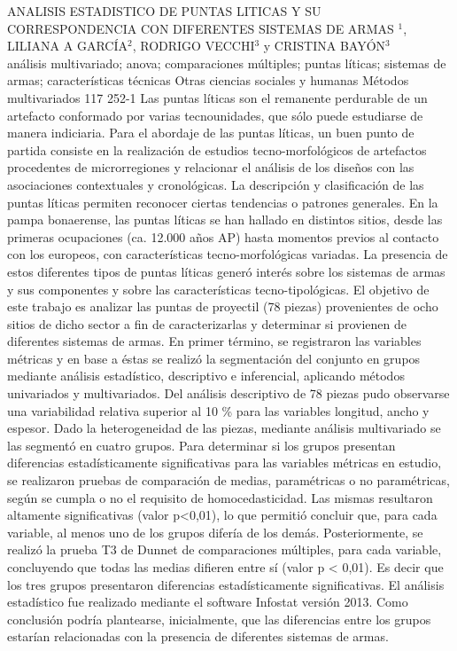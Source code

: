 \A
{ANALISIS ESTADISTICO DE PUNTAS LITICAS Y SU CORRESPONDENCIA CON DIFERENTES SISTEMAS DE ARMAS}
{$^1$, LILIANA A GARCÍA$^2$, RODRIGO VECCHI$^3$ y CRISTINA BAYÓN$^3$}
{
\\}
{análisis multivariado; anova; comparaciones múltiples; puntas líticas; sistemas de armas; características técnicas} 
 {Otras ciencias sociales y humanas} 
 {Métodos multivariados} 
 {117} 
 {252-1}
{Las puntas líticas son el remanente perdurable de un artefacto conformado por varias tecnounidades, que sólo puede estudiarse de manera indiciaria. Para el abordaje de las puntas líticas, un buen punto de partida consiste en la realización de estudios tecno-morfológicos de artefactos procedentes de microrregiones y relacionar el análisis de los diseños con las asociaciones contextuales y cronológicas. La descripción y clasificación de las puntas líticas permiten reconocer ciertas tendencias o patrones generales. En la pampa bonaerense, las puntas líticas se han hallado en distintos sitios, desde las primeras ocupaciones (ca. 12.000 años AP) hasta momentos previos al contacto con los europeos, con características tecno-morfológicas variadas. La presencia de estos diferentes tipos de puntas líticas generó interés sobre los sistemas de armas y sus componentes y sobre las características tecno-tipológicas. El objetivo de este trabajo es analizar las puntas de proyectil (78 piezas) provenientes de ocho sitios de dicho sector a fin de caracterizarlas y determinar si provienen de diferentes sistemas de armas. En primer término, se registraron las variables métricas y en base a éstas se realizó la segmentación del conjunto en grupos mediante análisis estadístico, descriptivo e inferencial, aplicando métodos univariados y multivariados. Del análisis descriptivo de 78 piezas pudo observarse una variabilidad relativa superior al 10 \% para las variables longitud, ancho y espesor. Dado la heterogeneidad de las piezas, mediante análisis multivariado se las segmentó en cuatro grupos. Para determinar si los grupos presentan diferencias estadísticamente significativas para las variables métricas en estudio, se realizaron pruebas de comparación de medias, paramétricas o no paramétricas, según se cumpla o no el requisito de homocedasticidad. Las mismas resultaron altamente significativas (valor p<0,01), lo que permitió concluir que, para cada variable, al menos uno de los grupos difería de los demás. Posteriormente, se realizó la prueba T3 de Dunnet de comparaciones múltiples, para cada variable, concluyendo que todas las medias difieren entre sí (valor p < 0,01). Es decir que los tres grupos presentaron diferencias estadísticamente significativas. El análisis estadístico fue realizado mediante el software Infostat versión 2013. Como conclusión podría plantearse, inicialmente, que las diferencias entre los grupos estarían relacionadas con la presencia de diferentes sistemas de armas. }
